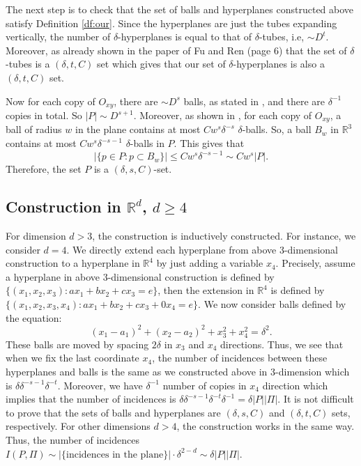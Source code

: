 \documentclass[11pt]{article}
\newcommand{\1}{\mathbf{1}}
\begin{document}
The next step is to check that the set of balls and hyperplanes constructed above satisfy Definition \ref{df:our}. Since the hyperplanes are just the tubes expanding vertically, the number of $\delta$-hyperplanes is equal to that of $\delta$-tubes, i.e, $\sim D^t$. Moreover, as already shown in the paper of Fu and Ren \cite{FuRen} (page 6) that the set of $\delta$-tubes is a $(\delta, t, C)$ set which gives that our set of $\delta$-hyperplanes is also a $(\delta, t, C)$ set.

Now for each copy of $O_{xy}$, there are $\sim D^{s}$ balls, as stated in \cite{FuRen}, and there are $\delta^{-1}$ copies in total. So $|P| \sim D^{s+1}$. Moreover, as shown in \cite{FuRen}, for each copy of $O_{xy}$, a ball of radius $w$ in the plane contains at most $Cw^{s}\delta^{-s}$ $\delta$-balls. So, a ball $B_w$ in $\mathbb R^3$ contains at most $Cw^{s}\delta^{-s-1}$ $\delta$-balls in $P$. This gives that
 \[|\{p \in P: p \subset B_w\}| \le C w^{s}\delta^{-s-1}\sim Cw^{s}|P|.\]
Therefore, the set $P$ is a $(
\delta,s,C)$-set.
\subsection{Construction in $\mathbb{R}^d$, $d\ge 4$}
For dimension $d>3$, the construction is inductively constructed. For instance, we consider $d=4$. We directly extend each hyperplane from above 3-dimensional construction to a hyperplane in $\mathbb R^4$ by just adding a variable $x_4$. Precisely, assume a hyperplane in above 3-dimensional construction is defined by $\{(x_1, x_2, x_3): ax_1+bx_2+cx_3=e\}$, then the extension in $\mathbb{R}^4$ is defined by $\{(x_1, x_2, x_3, x_4): ax_1+bx_2+cx_3 +0x_4=e\}.$ We now consider balls defined by the equation:
\[ (x_1-a_1)^2 +(x_2-a_2)^2+x_3^2+x_4^2=\delta^2.\] 
These balls are moved by spacing $2\delta$ in $x_3$ and $x_4$ directions. Thus, we see that when we fix the last coordinate $x_4$, the number of incidences between these hyperplanes and balls is the same as we constructed above in 3-dimension which is $\delta \delta^{-s-1} \delta^{-t}$. Moreover, we have $\delta^{-1}$ number of copies in $x_4$ direction which implies that the number of incidences is $ \delta \delta^{-s-1} \delta^{-t} \delta^{-1} =\delta |P||\Pi|$. It is not difficult to prove that the sets of balls and hyperplanes are $(\delta, s, C)$ and $(\delta, t, C)$ sets, respectively. For other dimensions $d > 4$, the construction works in the same way. Thus, the number of incidences 
$I(P,\Pi) \sim |\{\text{incidences in the plane}\}|\cdot \delta^{2-d} \sim \delta |P||\Pi|$. 
\end{document}
